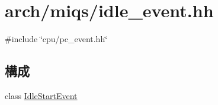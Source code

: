 \hypertarget{miqs_2idle__event_8hh}{
\section{arch/miqs/idle\_\-event.hh}
\label{miqs_2idle__event_8hh}
}
{\ttfamily \#include \char`\"{}cpu/pc\_\-event.hh\char`\"{}}\par
\subsection*{構成}
\begin{DoxyCompactItemize}
\item 
class \hyperlink{classIdleStartEvent}{IdleStartEvent}
\end{DoxyCompactItemize}
